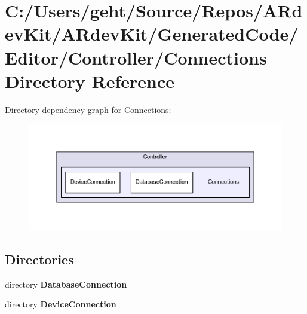 \section{C\-:/\-Users/geht/\-Source/\-Repos/\-A\-Rdev\-Kit/\-A\-Rdev\-Kit/\-Generated\-Code/\-Editor/\-Controller/\-Connections Directory Reference}
\label{dir_6622139ecec2cc9958013ab14b326488}
Directory dependency graph for Connections\-:
\nopagebreak
\begin{figure}[H]
\begin{center}
\leavevmode
\includegraphics[width=350pt]{dir_6622139ecec2cc9958013ab14b326488_dep}
\end{center}
\end{figure}
\subsection*{Directories}
\begin{DoxyCompactItemize}
\item 
directory {\bf Database\-Connection}
\item 
directory {\bf Device\-Connection}
\end{DoxyCompactItemize}
